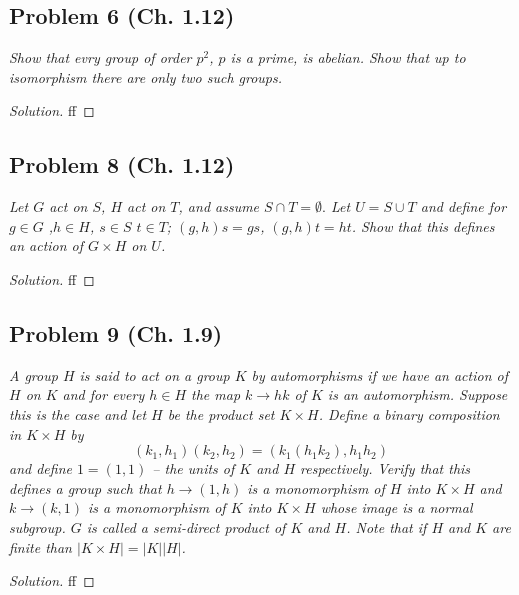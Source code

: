 \documentclass{article}
\begin{document}
\subsection*{Problem 6 (Ch. 1.12)}
{\it Show that evry group of order $p^2$, $p$ is a prime, is abelian.
Show that up to isomorphism there are only two such groups.}
\begin{proof}[Solution]\let\qed\relax
	ff
\end{proof}


\subsection*{Problem 8 (Ch. 1.12)}
{\it Let $G$ act on $S$, $H$ act on $T$, and assume $S \cap T = \emptyset.$
Let $U = S \cup T$ and define for $g \in G$ ,$h \in H$, $s \in S$ $t \in T$;
$(g,h)s = gs$, $(g,h)t = ht$.
Show that this defines an action of $G \times H$ on $U$.}
\begin{proof}[Solution]\let\qed\relax
	ff
\end{proof}

\subsection*{Problem 9 (Ch. 1.9)}
{\it A group $H$ is said to \emph{act on a group $K$ by automorphisms}
if we have an action of $H$ on $K$
and for every $h \in H$ the map $k \to hk$ of $K$ is an automorphism.
Suppose this is the case and let $H$ be the product set $K \times H$.
Define a binary composition in $K \times H$ by
\[
	(k_1, h_1)(k_2, h_2) = (k_1(h_1k_2), h_1h_2)
\]
and define $1=(1,1)$ -- the units of $K$ and $H$ respectively.
Verify that this defines a group such that $h \to (1,h)$
is a monomorphism of $H$ into $K \times H$
and $k \to (k,1)$ is a monomorphism of $K$ into $K \times H$
whose image is a normal subgroup.
$G$ is called a \emph{semi-direct product of $K$ and $H$}.
Note that if $H$ and $K$ are finite than $|K \times H| = |K||H|$.}
\begin{proof}[Solution]\let\qed\relax
	ff
\end{proof}
\end{document}
